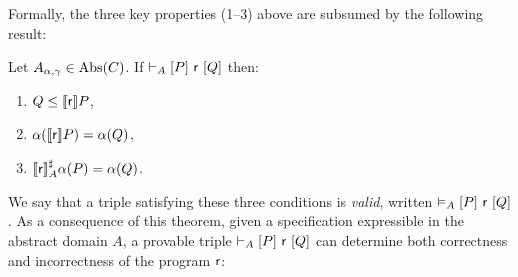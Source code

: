 Formally, the three key properties (1--3) above are subsumed by the following result:

\begin{theorem}\label{th:sota:lcl-soundness}
	Let $A_{\alpha, \gamma} \in \text{\normalfont Abs}(C)$.
	If $\vdash_{A}\nobreak[P]~\mathsf{r}~[Q]$ then:
	\begin{enumerate}
		\item $Q \le \llbracket\mathsf{r}\rrbracket P$,
		\item $\alpha(\llbracket\mathsf{r}\rrbracket P) = \alpha(Q)$,
		\item $\llbracket\mathsf{r}\rrbracket^{\sharp}_{A} \alpha(P) = \alpha(Q)$.
	\end{enumerate}
\end{theorem}

We say that a triple satisfying these three conditions is \emph{valid}, written $\vDash_{A}\nobreak[P]~\mathsf{r}~[Q]$.
As a consequence of this theorem, given a specification expressible in the abstract domain $A$, a provable triple $\vdash_{A}\nobreak[P]~\mathsf{r}~[Q]$ can determine both correctness and incorrectness of the program $\mathsf{r}$:


